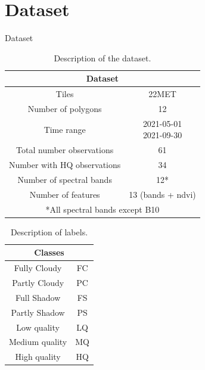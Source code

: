 \documentclass{beamer}
\begin{document}
\section{Dataset}
\begin{frame}{Dataset}
    \begin{minipage}{0.65\textwidth}
        \begin{table}
            \scriptsize
            \begin{tabular}{c|c}
                \hline
                \multicolumn{2}{c}{\textbf{Dataset}} \\
                \hline  	
                Tiles &  22MET \\
                Number of polygons & 12 \\
                Time range & \makecell{2021-05-01 \\ 2021-09-30} \\
                Total number observations & 61\\
                Number with HQ observations & 34 \\
                Number of spectral bands & 12*\\
                Number of features & 13 (bands + ndvi)\\
                \hline
                \multicolumn{2}{c}{*All spectral bands except B10} \\
            \end{tabular}
            \caption{Description of the dataset.}
        \end{table}
    \end{minipage}
    \begin{minipage}{0.3\textwidth}
        \begin{table}
            \scriptsize
            \begin{tabular}{c|c}
            \hline
                \multicolumn{2}{c}{\textbf{Classes}} \\ \hline
                Fully Cloudy & FC \\
                Partly Cloudy& PC \\
                Full Shadow & FS \\
                Partly Shadow& PS \\
                Low quality & LQ \\
                Medium quality & MQ\\
                High quality & HQ \\
                \hline
            \end{tabular}
            \caption{Description of labels.}
        \end{table}
    \end{minipage}
\end{frame}
\end{document}

